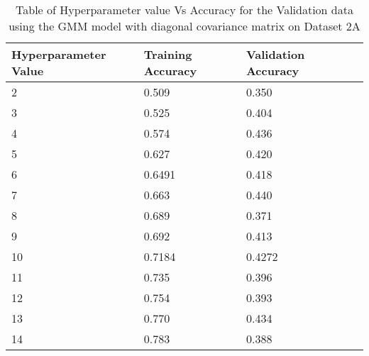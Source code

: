 \begin{table}[H]
\centering
\begin{tabular}{l l l l}
\hline
\hline
\textbf{Hyperparameter Value} & \textbf{Training Accuracy} & \textbf{Validation Accuracy}\\
\hline
\hline
2 & 0.509 & 0.350\\
3 & 0.525 & 0.404\\
4 & 0.574 & 0.436\\
5 & 0.627 & 0.420\\
6 & 0.6491 & 0.418\\
7 & 0.663 & 0.440\\
8 & 0.689 & 0.371\\
9 & 0.692 & 0.413\\
10 & 0.7184 & 0.4272\\
11 & 0.735 & 0.396\\
12 & 0.754 & 0.393\\
13 & 0.770 & 0.434\\
14 & 0.783 & 0.388\\
\hline
\end{tabular}
\caption{Table of Hyperparameter value Vs Accuracy for the Validation data using the GMM model with diagonal covariance matrix on Dataset 2A}
\label{tab:acc2a}
\end{table}

